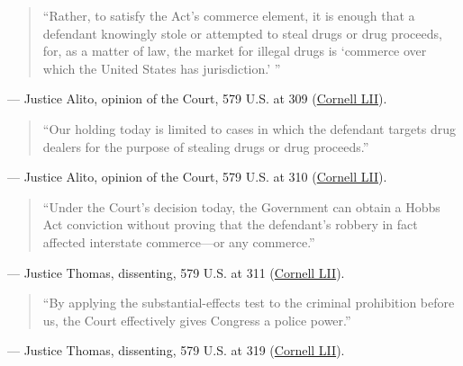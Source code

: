 \documentclass[12pt]{article}
\begin{document}
\begin{quote}
``Rather, to satisfy the Act's commerce element, it is enough that a defendant knowingly stole or attempted to steal drugs or drug proceeds, for, as a matter of law, the market for illegal drugs is `commerce over which the United States has jurisdiction.' ''
\end{quote}
\noindent --- Justice Alito, opinion of the Court, 579 U.S. at 309 (\href{https://www.law.cornell.edu/supremecourt/text/14-6166}{Cornell LII}).

\begin{quote}
``Our holding today is limited to cases in which the defendant targets drug dealers for the purpose of stealing drugs or drug proceeds.''
\end{quote}
\noindent --- Justice Alito, opinion of the Court, 579 U.S. at 310 (\href{https://www.law.cornell.edu/supremecourt/text/14-6166}{Cornell LII}).

\begin{quote}
``Under the Court's decision today, the Government can obtain a Hobbs Act conviction without proving that the defendant's robbery in fact affected interstate commerce---or any commerce.''
\end{quote}
\noindent --- Justice Thomas, dissenting, 579 U.S. at 311 (\href{https://www.law.cornell.edu/supremecourt/text/14-6166}{Cornell LII}).

\begin{quote}
``By applying the substantial-effects test to the criminal prohibition before us, the Court effectively gives Congress a police power.''
\end{quote}
\noindent --- Justice Thomas, dissenting, 579 U.S. at 319 (\href{https://www.law.cornell.edu/supremecourt/text/14-6166}{Cornell LII}).
\end{document}
